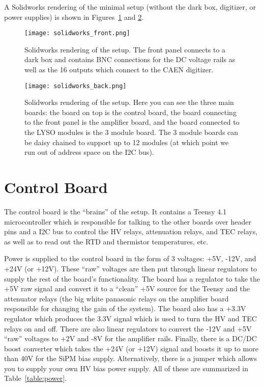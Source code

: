 \documentclass[12pt,openright,twoside]{report}
\begin{document}
A Solidworks rendering of the minimal setup (without the dark box, digitizer,
or power supplies) is shown in Figures~\ref{fig:solidworks-front} and
\ref{fig:solidworks-back}.

\begin{figure}
\centering
\texttt{[image: solidworks\_front.png]}
\caption{Solidworks rendering of the setup. The front panel connects to a dark box and contains BNC connections for the DC voltage rails as well as the 16 outputs which connect to the CAEN digitizer.}
\label{fig:solidworks-front}
\end{figure}
\begin{figure}
\centering
\texttt{[image: solidworks\_back.png]}
\caption{Solidworks rendering of the setup. Here you can see the three main boards: the board on top is the control board, the board connecting to the front panel is the amplifier board, and the board connected to the LYSO modules is the 3 module board. The 3 module boards can be daisy chained to support up to 12 modules (at which point we run out of address space on the I2C bus).}
\label{fig:solidworks-back}
\end{figure}
\section{Control Board}
The control board is the ``brains'' of the setup. It contains a Teensy 4.1
microcontroller which is responsible for talking to the other boards over
header pins and a I2C bus to control the HV relays, attenuation relays, and TEC
relays, as well as to read out the RTD and thermistor temperatures, etc.

Power is supplied to the control board in the form of 3 voltages: +5V, -12V,
and +24V (or +12V). These ``raw'' voltages are then put through linear
regulators to supply the rest of the board's functionality. The board has a
regulator to take the +5V raw signal and convert it to a ``clean'' +5V source
for the Teensy and the attenuator relays (the big white panasonic relays on the
amplifier board responsible for changing the gain of the system). The board
also has a +3.3V regulator which produces the 3.3V signal which is used to turn
the HV and TEC relays on and off. There are also linear regulators to convert
the -12V and +5V ``raw'' voltages to +2V and -8V for the amplifier rails.
Finally, there is a DC/DC boost converter which takes the +24V (or +12V) signal
and boosts it up to more than 40V for the SiPM bias supply. Alternatively,
there is a jumper which allows you to supply your own HV bias power supply. All
of these are summarized in Table~\ref{table:power}.
\end{document}
